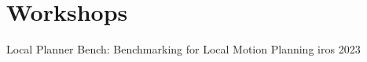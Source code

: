 \section*{Workshops}

\begin{etaremune}{\small

\item {}
  {Local Planner Bench: Benchmarking for Local Motion Planning}
  {\acl{iros}}
  {2023}

}\end{etaremune}





